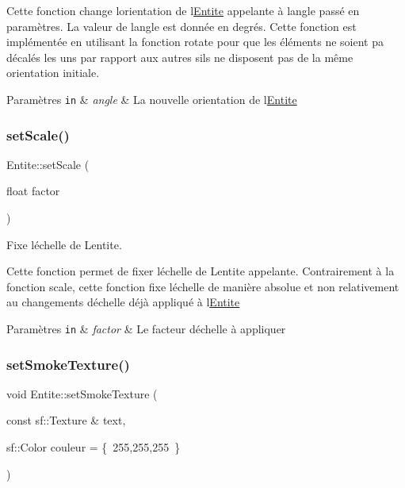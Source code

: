 Cette fonction change l\textquotesingle{}orientation de l\textquotesingle{}\hyperlink{class_entite}{Entite} appelante à l\textquotesingle{}angle passé en paramètres. La valeur de l\textquotesingle{}angle est donnée en degrés. Cette fonction est implémentée en utilisant la fonction rotate pour que les éléments ne soient pa décalés les uns par rapport aux autres s\textquotesingle{}ils ne disposent pas de la même orientation initiale. 
\begin{DoxyParams}[1]{Paramètres}
\mbox{\tt in}  & {\em angle} & La nouvelle orientation de l\textquotesingle{}\hyperlink{class_entite}{Entite} \\
\hline
\end{DoxyParams}
\mbox{\label{class_entite_a665939253829baba965ce3ead0f1739c}} 
\subsubsection{\texorpdfstring{set\+Scale()}{setScale()}}
{\footnotesize\ttfamily Entite\+::set\+Scale (\begin{DoxyParamCaption}\item[{float}]{factor }\end{DoxyParamCaption})}



Fixe l\textquotesingle{}échelle de L\textquotesingle{}entite. 

Cette fonction permet de fixer l\textquotesingle{}échelle de L\textquotesingle{}entite appelante. Contrairement à la fonction scale, cette fonction fixe l\textquotesingle{}échelle de manière absolue et non relativement au changements d\textquotesingle{}échelle déjà appliqué à l\textquotesingle{}\hyperlink{class_entite}{Entite} 
\begin{DoxyParams}[1]{Paramètres}
\mbox{\tt in}  & {\em factor} & Le facteur d\textquotesingle{}échelle à appliquer \\
\hline
\end{DoxyParams}
\mbox{\label{class_entite_a8cf9eefe7401a127d7692ca379528050}} 
\subsubsection{\texorpdfstring{set\+Smoke\+Texture()}{setSmokeTexture()}}
{\footnotesize\ttfamily void Entite\+::set\+Smoke\+Texture (\begin{DoxyParamCaption}\item[{const sf\+::\+Texture \&}]{text,  }\item[{sf\+::\+Color}]{couleur = {\ttfamily \{~255,255,255~\}} }\end{DoxyParamCaption})}



